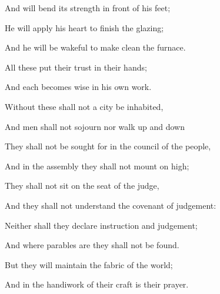 {\par }{\Q And will bend its strength in front of his feet;
\par }{\Q He will apply his heart to finish the glazing;
\par }{\Q And he will be wakeful to make clean the furnace.
\par }{\BB \par }{\Q {}All these put their trust in their hands;
\par }{\Q And each becomes wise in his own work.
\par }{\Q {}Without these shall not a city be inhabited,
\par }{\Q And men shall not sojourn nor walk up and down
{}
\par }{\Q {} They shall not be sought for in the council of the people,
\par }{\Q And in the assembly they shall not mount on high;
\par }{\Q They shall not sit on the seat of the judge,
\par }{\Q And they shall not understand the covenant of judgement:
\par }{\Q Neither shall they declare instruction and judgement;
\par }{\Q And where parables are they shall not be found.
\par }{\Q {}But they will maintain the fabric of the
 world;
\par }{\Q And in the handiwork of their craft is their prayer.
\par }{\BB \par }
